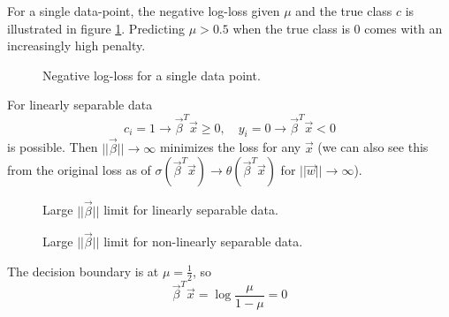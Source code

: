 For a single data-point, the negative log-loss given $\mu$
and the true class $c$ is illustrated in figure \ref{fig:log_loss}.
Predicting $\mu > 0.5$ when the true class is $0$ comes
with an increasingly high penalty.

\begin{figure}[!htb]
    \centering
    
    \caption{Negative log-loss for a single data point.}
    \label{fig:log_loss}
\end{figure}

For linearly separable data
\begin{equation}
    c_i = 1 \rightarrow \vec{\beta}^T \vec{x} \geq 0, \quad y_i = 0 \rightarrow \vec{\beta}^T \vec{x} < 0
\end{equation}
is possible. Then $||\vec{\beta}|| \rightarrow \infty$ minimizes the
loss for any $\vec{x}$ (we can also see this from the original
loss as of $\sigma(\vec{\beta}^T \vec{x}) \rightarrow \theta(\vec{\beta}^T \vec{x})$ for $||\vec{w}|| \rightarrow \infty$).


\begin{figure}[!htb]
    \centering
    
    \caption{Large $||\vec{\beta}||$ limit for linearly separable data.}
    \label{fig:separable_w_inf}
\end{figure}


\begin{figure}[!htb]
    \centering
    
    \caption{Large $||\vec{\beta}||$ limit for non-linearly separable data.}
    \label{fig:non_separable_w_inf}
\end{figure}

The decision boundary is at $\mu = \frac{1}{2}$, so
\begin{equation}
    \vec{\beta}^T \vec{x} = \log \frac{\mu}{1-\mu} = 0
\end{equation}

